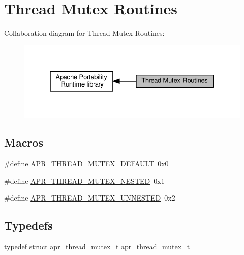 \hypertarget{group__apr__thread__mutex}{}\section{Thread Mutex Routines}
\label{group__apr__thread__mutex}
Collaboration diagram for Thread Mutex Routines\+:
\nopagebreak
\begin{figure}[H]
\begin{center}
\leavevmode
\includegraphics[width=331pt]{group__apr__thread__mutex}
\end{center}
\end{figure}
\subsection*{Macros}
\begin{DoxyCompactItemize}
\item 
\#define \hyperlink{group__apr__thread__mutex_ga579050872f9aff06e773b084264f7d06}{A\+P\+R\+\_\+\+T\+H\+R\+E\+A\+D\+\_\+\+M\+U\+T\+E\+X\+\_\+\+D\+E\+F\+A\+U\+LT}~0x0
\item 
\#define \hyperlink{group__apr__thread__mutex_gaf421e0445dbc3c739130f5f6544c2e78}{A\+P\+R\+\_\+\+T\+H\+R\+E\+A\+D\+\_\+\+M\+U\+T\+E\+X\+\_\+\+N\+E\+S\+T\+ED}~0x1
\item 
\#define \hyperlink{group__apr__thread__mutex_gac31107f3db115edc0c26ea48943c6a16}{A\+P\+R\+\_\+\+T\+H\+R\+E\+A\+D\+\_\+\+M\+U\+T\+E\+X\+\_\+\+U\+N\+N\+E\+S\+T\+ED}~0x2
\end{DoxyCompactItemize}
\subsection*{Typedefs}
\begin{DoxyCompactItemize}
\item 
typedef struct \hyperlink{structapr__thread__mutex__t}{apr\+\_\+thread\+\_\+mutex\+\_\+t} \hyperlink{group__apr__thread__mutex_ga95712060ba3a192036416e1ccef1db75}{apr\+\_\+thread\+\_\+mutex\+\_\+t}
\end{DoxyCompactItemize}
